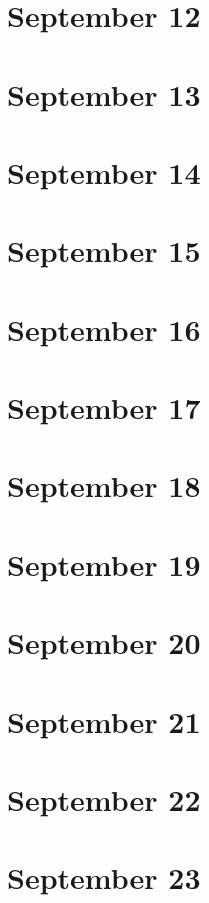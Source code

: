 \section{September 12}

\section{September 13}

\section{September 14}

\section{September 15}

\section{September 16}

\section{September 17}

\section{September 18}

\section{September 19}

\section{September 20}

\section{September 21}

\section{September 22}

\section{September 23}

